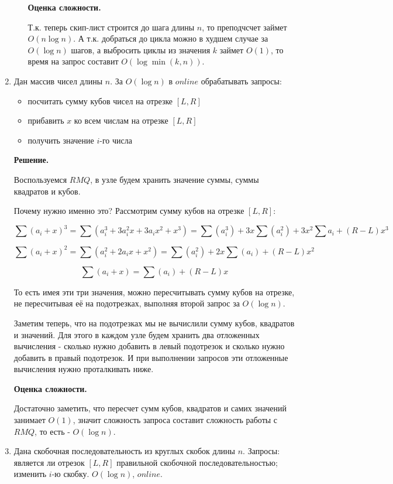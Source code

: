 \begin{enumerate}
\begin{itemize}
		\textbf{Оценка сложности.} 
		
		Т.к. теперь скип-лист строится до шага длины $n$, то преподчсчет займет $O(n \log n)$. 
		А т.к. добраться до цикла можно в худшем случае за $O(\log n )$ шагов, а выбросить 
		циклы из значения $k$ займет $O(1)$, то время на запрос составит $O(\log \min(k,n))$. 
	\end{itemize}
	
	\item Дан массив чисел длины $n$. За $O(\log n)$ в $online$ обрабатывать запросы:
	\begin{itemize}
		\item посчитать сумму кубов чисел на отрезке $[L, R]$
		\item прибавить $x$ ко всем числам на отрезке $[L, R]$
		\item получить значение $i$-го числа
	\end{itemize}
	
	\textbf{Решение.}
	
	Воспользуемся $RMQ$, в узле будем хранить значение суммы, суммы квадратов и кубов.
	
	Почему нужно именно это? Рассмотрим сумму кубов на отрезке $[L, R]$:
	
	$$\sum (a_i + x)^3 = \sum (a_i^3 + 3a_i^2x + 3a_ix^2 + x^3) = \sum (a_i^3) + 3x\sum(a_i^2) + 3x^2\sum a_i + (R-L)x^3$$
	
	$$\sum (a_i + x)^2 = \sum (a_i^2 + 2a_ix + x^2) = \sum (a_i^2) + 2x\sum(a_i) + (R-L)x^2$$
	
	$$\sum (a_i + x) = \sum(a_i) + (R-L)x$$
	
	То есть имея эти три значения, можно пересчитывать сумму кубов на отрезке, не пересчитывая 
	её на подотрезках, выполняя второй запрос за $O(\log n)$. 
	
	Заметим теперь, что на подотрезках мы не вычислили сумму кубов, квадратов и значений. Для 
	этого в каждом узле будем хранить два отложенных вычисления - сколько нужно добавить в 
	левый подотрезок и сколько нужно добавить в правый подотрезок. И при выполнении запросов эти отложенные вычисления нужно проталкивать ниже. 
	
	\textbf{Оценка сложности.} 
	
	Достаточно заметить, что пересчет сумм кубов, квадратов и самих значений занимает $O(1)$, значит сложность запроса составит сложность работы с $RMQ$, то есть - $O(\log n)$.
	
	\item Дана скобочная последовательность из круглых скобок длины $n$. Запросы: является ли 
	отрезок $[L, R]$ правильной скобочной последовательностью; изменить $i$-ю скобку. $O(\log 
	n)$, $online$.
	

\end{enumerate}
